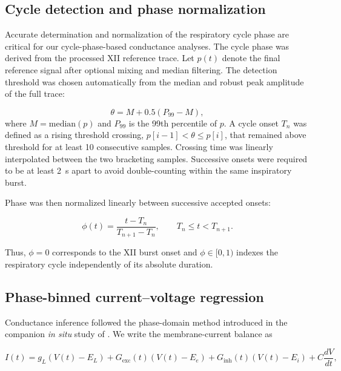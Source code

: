 \documentclass[
]{article}
\begin{document}
\subsection{Cycle detection and phase normalization}\label{cycle-detection-and-phase-normalization}

Accurate determination and normalization of the respiratory cycle phase are critical for our cycle-phase-based conductance analyses. The cycle phase was derived from the processed XII reference trace. Let \(p(t)\) denote the final reference signal after optional mixing and median filtering. The detection threshold was chosen automatically from the median and robust peak amplitude of the full trace:

\begin{equation}
\theta = M + 0.5\left(P_{99} - M\right),
\end{equation}
where \(M = \mathrm{median}(p)\) and \(P_{99}\) is the 99th percentile of \(p\). A cycle onset \(T_n\) was defined as a rising threshold crossing, \(p[i-1] < \theta \le p[i]\), that remained above threshold for at least 10 consecutive samples. Crossing time was linearly interpolated between the two bracketing samples. Successive onsets were required to be at least 2~s apart to avoid double-counting within the same inspiratory burst.

Phase was then normalized linearly between successive accepted onsets:

\begin{equation}
\phi(t) = \frac{t - T_n}{T_{n+1} - T_n}, \qquad T_n \le t < T_{n+1}.
\end{equation}

Thus, \(\phi = 0\) corresponds to the XII burst onset and \(\phi \in [0,1)\) indexes the respiratory cycle independently of its absolute duration.

\subsection{Phase-binned current--voltage regression}\label{phase-binned-currentvoltage-regression}

Conductance inference followed the phase-domain method introduced in the companion \emph{in situ} study of \citet{molkov2024inference}. We write the membrane-current balance as

\begin{equation}
I(t) = g_L\!\left(V(t)-E_L\right) + G_{\mathrm{exc}}(t)\!\left(V(t)-E_e\right) + G_{\mathrm{inh}}(t)\!\left(V(t)-E_i\right) + C\frac{dV}{dt},
\label{eq:balance}
\end{equation}
\end{document}
